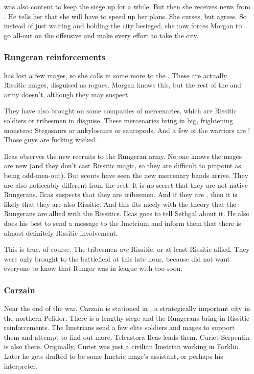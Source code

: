 \begin{garbage}
\Takestsha{} was also content to keep the siege up for a while. 
But then she receives news from \LocarPsyrex. 
He tells her that she will have to speed up her plans. 
She curses, but agrees. 
So instead of just waiting and holding the city besieged, she now forces Morgan to go all-out on the offensive and make every effort to take the city. 





\subsubsection{Rungeran reinforcements}
\Takestsha{} has lost a few mages, so she calls in some more  to the \ishrah. 
These are actually Rissitic mages, disguised as rogues. 
Morgan knows this, but the rest of the \ishrah{} and army doesn't, although they may suspect. 

They have also brought on some companies of mercenaries, which are Rissitic soldiers or \Durcaci{} tribesmen in disguise. 
These mercenaries bring in big, frightening monsters: 
Stegosaurs or ankylosaurs or sauropods. 
And a few of the warriors are \cregorrs!
Those guys are fucking wicked. 

Ilcas observes the new recruits to the Rungeran army. 
No one knows the mages are new (and they don't cast Rissitic magic, so they are difficult to pinpoint as being odd-men-out). 
But scouts have seen the new mercenary bands arrive. 
They are also noticeably different from the rest. 
It is no secret that they are not native Rungerans. 
Ilcas suspects that they are \Durcaci{} tribesmen. 
And if they are \Durcaci, then it is likely that they are also Rissitic. 
And this fits nicely with the theory that the Rungerans are allied with the Rissitics. 
Ilcas goes to tell Sethgal about it. 
He also does his best to send a message to the Imetrium and inform them that there is almost definitely Rissitic involvement. 

This is true, of course. 
The tribesmen \emph{are} Rissitic, or at least Rissitic-allied. 
They were only brought to the battlefield at this late hour, because \Takestsha{} did not want everyone to know that Runger was in league with \Durcac{} too soon. 





\subsubsection{Carzain}
Near the end of the war, Carzain is stationed in \Forklin{}, a strategically important city in the northern Pelidor. There is a lengthy siege and the Rungerans bring in Rissitic reinforcements. 
The Imetrians send a few elite soldiers and mages to support them and attempt to find out more. Telcastora Ilcas leads them. Curiet Serpentin is also there. Originally, Curiet was just a civilian Imetrian working in Forklin. Later he gets drafted to be some Imetric mage's assistant, or perhaps his interpreter. 


\end{garbage}
